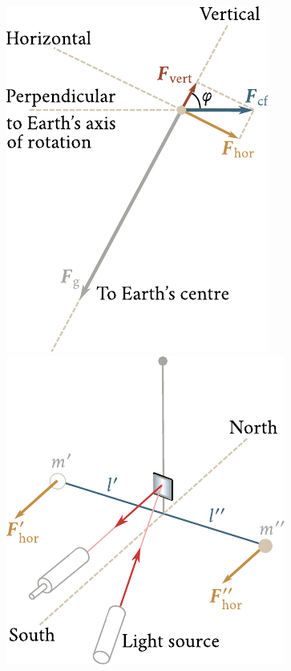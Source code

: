 \begin{figure}[t]
	\begin{minipage}[t]{0.5\linewidth}
		\begin{center}
			\includegraphics[scale=0.9]{figures/ch_06/fig_6_5.pdf}
			\caption[]{}
			\label{fig:6_5}
		\end{center}
	\end{minipage}
	\hspace{-0.05cm}
	\begin{minipage}[t]{0.5\linewidth}
		\begin{center}
			\includegraphics[scale=0.9]{figures/ch_06/fig_6_6.pdf}
			\caption[]{}
			\label{fig:6_6}
		\end{center}
	\end{minipage}
	\vspace{-0.5cm}
\end{figure}

